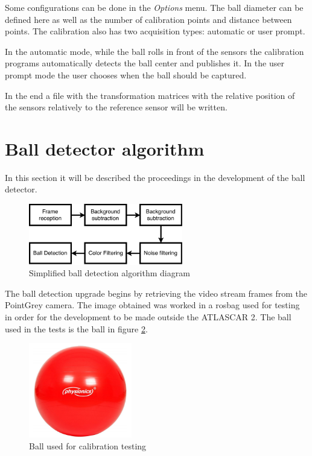 Some configurations can be done in the \textit{Options} menu. The ball diameter can be defined here as well as the number of calibration points and distance between points. The calibration also has two acquisition types: automatic or user prompt. 

In the automatic mode, while the ball rolls in front of the sensors the calibration programs automatically detects the ball center and publishes it. In the user prompt mode the user chooses when the ball should be captured.

In the end a file with the transformation matrices with the relative position of the sensors relatively to the reference sensor will be written.

\section{Ball detector algorithm}

In this section it will be described the proceedings in the development of the ball detector.

\begin{figure}[htp]
	
	\centering
	\includegraphics[width=0.6\textwidth]{capcalib/imgs/calib_implementation.pdf}
	
	\caption{Simplified ball detection algorithm diagram}
	\label{fig:ball_diagram}
	
\end{figure}

The ball detection upgrade begins by retrieving the video stream frames from the PointGrey camera. The image obtained was worked in a rosbag used for testing in order for the development to be made outside the ATLASCAR 2. The ball used in the tests is the ball in figure \ref{fig:ball}. 

\begin{figure}[htp]
	
	\centering
	\includegraphics[width=0.4\textwidth]{capcalib/imgs/ball.png}
	
	\caption{Ball used for calibration testing}
	\label{fig:ball}
	
\end{figure}

